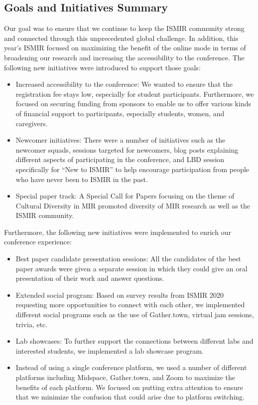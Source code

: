 \documentclass[%
10pt,								%
titlepage,						%
]
{scrartcl}
\begin{document}
    \subsection{Goals and Initiatives Summary}
        Our goal was to ensure that we continue to keep the ISMIR community strong and connected through this unprecedented global challenge. In addition, this year's ISMIR focused on maximizing the benefit of the online mode in terms of broadening our research and increasing the accessibility to the conference. The following new initiatives were introduced to support those goals: 
        \begin{itemize}
            \item   Increased accessibility to the conference: We wanted to ensure that the registration fee stays low, especially for student participants. Furthermore, we focused on securing funding from sponsors to enable us to offer various kinds of financial support to participants, especially students, women, and caregivers. 
            \item   Newcomer initiatives: There were a number of initiatives such as the newcomer squads, sessions targeted for newcomers, blog posts explaining different aspects of participating in the conference, and LBD session specifically for ``New to ISMIR'' to help encourage participation from people who have never been to ISMIR in the past. 
            \item   Special paper track: A Special Call for Papers focusing on the theme of Cultural Diversity in MIR promoted diversity of MIR research as well as the ISMIR community. 
        \end{itemize}

        Furthermore, the following new initiatives were implemented to enrich our conference experience:
        \begin{itemize}
            \item   Best paper candidate presentation sessions: All the candidates of the best paper awards were given a separate session in which they could give an oral presentation of their work and answer questions.
            \item   Extended social program: Based on survey results from ISMIR 2020 requesting more opportunities to connect with each other, we implemented different social programs such as the use of Gather.town, virtual jam sessions, trivia, etc.
            \item   Lab showcases: To further support the connections between different labs and interested students, we implemented a lab showcase program.
            \item   Instead of using a single conference platform, we used a number of different platforms including Midspace, Gather.town, and Zoom to maximize the benefits of each platform. We focused on putting extra attention to ensure that we minimize the confusion that could arise due to platform switching. 
        \end{itemize}
\end{document}
